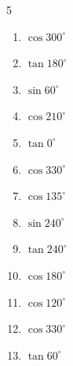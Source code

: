\begin{multicols}{5}
\begin{enumerate}
  \item $\displaystyle \cos{300^\circ}$


  \item $\displaystyle \tan{180^\circ}$

        \phantom{$\displaystyle =0$}

  \item $\displaystyle \sin{60^\circ}$


  \item $\displaystyle \cos{210^\circ}$


  \item $\displaystyle \tan{0^\circ}$

        \phantom{$\displaystyle =0$}

  \item $\displaystyle \cos{330^\circ}$


  \item $\displaystyle \cos{135^\circ}$


  \item $\displaystyle \sin{240^\circ}$


  \item $\displaystyle \tan{240^\circ}$


  \item $\displaystyle \cos{180^\circ}$

        \phantom{$\displaystyle =-1$}

  \item $\displaystyle \cos{120^\circ}$


  \item $\displaystyle \cos{330^\circ}$


  \item $\displaystyle \tan{60^\circ}$


\end{enumerate}
\end{multicols}
